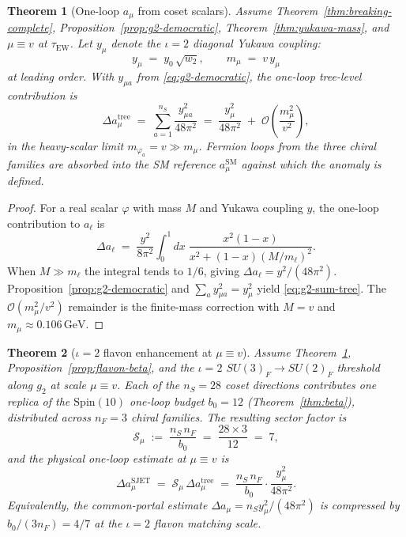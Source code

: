 \documentclass[11pt]{article}
\theoremstyle{plain}
\newtheorem{theorem}{Theorem}[section]
\theoremstyle{definition}
\theoremstyle{remark}
\numberwithin{equation}{section}
\newcommand{\Spin}{\mathrm{Spin}}
\begin{document}
\begin{theorem}[One-loop $a_\mu$ from coset scalars]\label{thm:g2-oneloop}
Assume Theorem~\ref{thm:breaking-complete}, Proposition~\ref{prop:g2-democratic},
Theorem~\ref{thm:yukawa-mass}, and $\mu\equiv v$ at $\tau_{\mathrm{EW}}$.
Let $y_\mu$ denote the $\iota=2$ diagonal Yukawa coupling:
\begin{equation}\label{eq:ymu-def}
  y_\mu \;=\; y_0\,\sqrt{w_2},
  \qquad
  m_\mu \;=\; v\,y_\mu
\end{equation}
at leading order. With $y_{\mu a}$ from \eqref{eq:g2-democratic}, the
one-loop tree-level contribution is
\begin{equation}\label{eq:g2-sum-tree}
  \Delta a_\mu^{\mathrm{tree}}
  \;=\;
  \sum_{a=1}^{n_S}
  \frac{y_{\mu a}^2}{48\pi^2}
  \;=\;
  \frac{y_\mu^2}{48\pi^2}
  \;+\;
  \mathcal{O}\!\left(\frac{m_\mu^2}{v^2}\right),
\end{equation}
in the heavy-scalar limit $m_{\varphi_a}=v\gg m_\mu$. Fermion loops from the
three chiral families are absorbed into the SM reference
$a_\mu^{\mathrm{SM}}$ against which the anomaly is defined.
\end{theorem}

\begin{proof}
For a real scalar $\varphi$ with mass $M$ and Yukawa coupling $y$, the
one-loop contribution to $a_\ell$ is~\cite{Leveille1978}
\begin{equation}\label{eq:g2-integral}
  \Delta a_\ell
  \;=\;
  \frac{y^2}{8\pi^2}
  \int_0^1\!dx\;
  \frac{x^2(1-x)}{x^2+(1-x)(M/m_\ell)^2}.
\end{equation}
When $M\gg m_\ell$ the integral tends to $1/6$, giving
$\Delta a_\ell=y^2/(48\pi^2)$. Proposition~\ref{prop:g2-democratic} and
$\sum_a y_{\mu a}^2=y_\mu^2$ yield \eqref{eq:g2-sum-tree}. The
$\mathcal{O}(m_\mu^2/v^2)$ remainder is the finite-mass correction with
$M=v$ and $m_\mu\approx0.106\,\mathrm{GeV}$.
\end{proof}

\begin{theorem}[$\iota=2$ flavon enhancement at $\mu\equiv v$]\label{thm:g2-flavon}
Assume Theorem~\ref{thm:g2-oneloop}, Proposition~\ref{prop:flavon-beta}, and
the $\iota=2$ $SU(3)_F\to SU(2)_F$ threshold along $g_2$ at scale $\mu\equiv v$.
Each of the $n_S=28$ coset directions contributes one replica of the
$\Spin(10)$ one-loop budget $b_0=12$ (Theorem~\ref{thm:beta}), distributed
across $n_F=3$ chiral families. The resulting sector factor is
\begin{equation}\label{eq:g2-sector-factor}
  \mathcal{S}_{\mu}
  \;:=\;
  \frac{n_S\,n_F}{b_0}
  \;=\;
  \frac{28\times 3}{12}
  \;=\;
  7,
\end{equation}
and the physical one-loop estimate at $\mu\equiv v$ is
\begin{equation}\label{eq:g2-sum}
  \Delta a_\mu^{\mathrm{SJET}}
  \;=\;
  \mathcal{S}_{\mu}\,
  \Delta a_\mu^{\mathrm{tree}}
  \;=\;
  \frac{n_S\,n_F}{b_0}\cdot\frac{y_\mu^2}{48\pi^2}.
\end{equation}
Equivalently, the common-portal estimate
$\Delta a_\mu=n_S y_\mu^2/(48\pi^2)$ is compressed by
$b_0/(3n_F)=4/7$ at the $\iota=2$ flavon matching scale.
\end{theorem}
\end{document}
